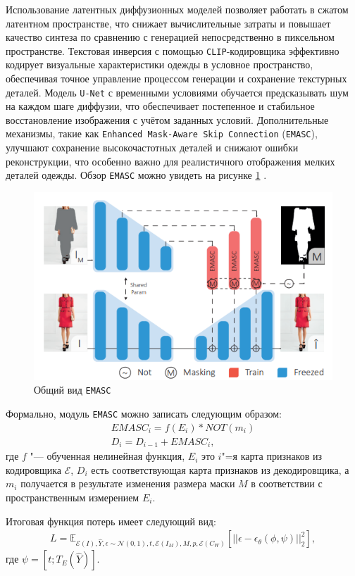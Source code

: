 Использование латентных диффузионных моделей позволяет работать в сжатом латентном пространстве, что снижает вычислительные затраты и повышает качество синтеза по сравнению с генерацией непосредственно в пиксельном пространстве. Текстовая инверсия с помощью \texttt{CLIP}-кодировщика эффективно кодирует визуальные характеристики одежды в условное пространство, обеспечивая точное управление процессом генерации и сохранение текстурных деталей. Модель \texttt{U-Net} с временными условиями обучается предсказывать шум на каждом шаге диффузии, что обеспечивает постепенное и стабильное восстановление изображения с учётом заданных условий. Дополнительные механизмы, такие как \texttt{Enhanced Mask-Aware Skip Connection} (\texttt{EMASC}), улучшают сохранение высокочастотных деталей и снижают ошибки реконструкции, что особенно важно для реалистичного отображения мелких деталей одежды. Обзор \texttt{EMASC} можно увидеть на рисунке \ref{fig:ladi_emasc} \cite{ladi}.
\begin{figure}[H]
    \centering
    \includegraphics[width=0.9\linewidth]{images/ladi_emasc.png}
    \caption{Общий вид \texttt{EMASC}}
    \label{fig:ladi_emasc}
\end{figure}

Формально, модуль \texttt{EMASC} можно записать следующим образом:
\begin{gather}
    EMASC_i = f(E_i) * NOT(m_i) \\
    D_i = D_{i-1} + EMASC_i,
\end{gather}
где $f$ "--- обученная нелинейная функция, $E_i$ это $i$"=я карта признаков из кодировщика $\mathcal{E}$, $D_i$ есть соответствующая карта признаков из декодировщика, а $m_i$ получается в результате изменения размера маски $M$ в соответствии с пространственным измерением $E_i$.

Итоговая функция потерь имеет следующий вид:
\begin{gather}
    L = \mathbb{E}_{\mathcal{E}(I), \widehat{Y}, \epsilon \sim \mathcal{N}(0, 1),t,\mathcal{E}(I_M), M, p, \mathcal{E}(C_W)}[||\epsilon - \epsilon_{\theta}(\phi, \psi)||_2^2],
\end{gather}
где $\psi = [t;T_E(\widehat{Y})]$.